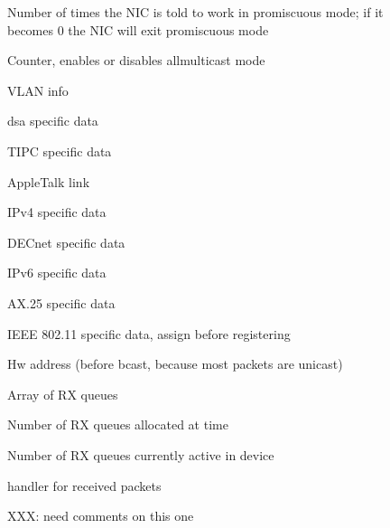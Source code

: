 \documentclass[a4paper,8pt,english]{sphinxmanual}
\begin{document}
\begin{description}
\item[{}] \leavevmode
Number of times the NIC is told to work in
promiscuous mode; if it becomes 0 the NIC will
exit promiscuous mode

\item[{}] \leavevmode
Counter, enables or disables allmulticast mode

\item[{}] \leavevmode
VLAN info

\item[{}] \leavevmode
dsa specific data

\item[{}] \leavevmode
TIPC specific data

\item[{}] \leavevmode
AppleTalk link

\item[{}] \leavevmode
IPv4 specific data

\item[{}] \leavevmode
DECnet specific data

\item[{}] \leavevmode
IPv6 specific data

\item[{}] \leavevmode
AX.25 specific data

\item[{}] \leavevmode
IEEE 802.11 specific data, assign before registering

\item[{}] \leavevmode
Hw address (before bcast,
because most packets are unicast)

\item[{}] \leavevmode
Array of RX queues

\item[{}] \leavevmode
Number of RX queues
allocated at {\hyperref[networking/kapi:c.register_netdev]{\emph{}}} time

\item[{}] \leavevmode
Number of RX queues currently active in device

\item[{}] \leavevmode
handler for received packets

\item[{}] \leavevmode
XXX: need comments on this one


\end{description}
\end{document}
